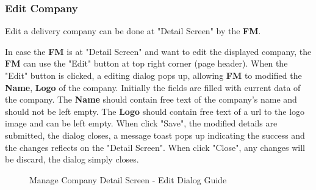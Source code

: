 \subsubsection{Edit Company}

Edit a delivery company can be done at "Detail Screen" by the \textbf{FM}.
\bigskip

In case the \textbf{FM} is at "Detail Screen" and want to edit the displayed company, the \textbf{FM} can use the "Edit" button at top right corner (page header). 
When the "Edit" button is clicked, a editing dialog pops up, allowing \textbf{FM} to modified the \textbf{Name}, \textbf{Logo} of the company. Initially the fields are filled with current data of the company. The \textbf{Name} should contain free text of the company's name and should not be left empty. The \textbf{Logo} should contain free text of a url to the logo image and can be left empty.
When click "Save", the modified details are submitted, the dialog closes, a message toast pops up indicating the success and the changes reflects on the "Detail Screen". When click "Close", any changes will be discard, the dialog simply closes.

\begin{figure}[H]
	\centering
    \vspace{5pt}
    \hspace{5pt}
    \caption{Manage Company Detail Screen - Edit Dialog Guide}
	\label{fig:MCDetailEditBtn}
\end{figure}

